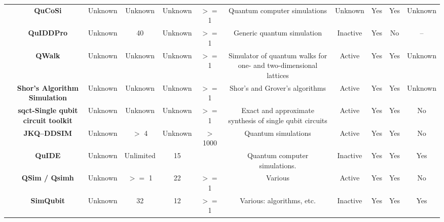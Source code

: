 \documentclass[conference]{IEEEtran}
\begin{document}
\begin{table*}[h!]
{\begin{tabular}{c|c|c|c|c|c|c|c|c|c|c}
	           & \textbf{QuCoSi } & Unknown & Unknown & Unknown & $>=$1 & Quantum computer simulations & Unknown & Yes   & Yes   & Unknown \\
	           & \textbf{QuIDDPro } & Unknown & 40    & Unknown & $>=$1 & Generic quantum simulation & Inactive & Yes   & No    & -- \\
	           & \textbf{QWalk } & Unknown & Unknown & Unknown & $>=$1 & Simulator of quantum walks for one- and two-dimensional lattices & Active & Yes   & Yes   & Unknown \\
	           & \textbf{Shor's Algorithm Simulation } & Unknown & Unknown & Unknown & $>=$1 & Shor's and Grover's algorithms & Active & Yes   & Yes   & Unknown \\
	           & \textbf{sqct-Single qubit circuit toolkit } & Unknown & Unknown & Unknown & $>=$1 & Exact and approximate synthesis of single qubit circuits & Active & Yes   & Yes   & No \\
	           & \textbf{JKQ--DDSIM } & Unknown & $>$ 4   & Unknown & $>$ 1000 & Quantum simulations & Active & Yes   & Yes   & No \\
     		   & \textbf{QuIDE } & Unknown & \cellcolor{gray!50} Unlimited & 15    &       & Quantum computer simulations. & Inactive & Yes   & Yes   & Yes \\ 
      	 	   & \textbf{QSim / Qsimh} & Unknown & $>=$ 1   & 22    & $>=$ 1  & Various & Active & Yes   & Yes   & No \\
               & \textbf{SimQubit } & Unknown & 32    & 12    & $>=$ 1  & Various: algorithms, etc. & Inactive & Yes   & Yes   & Yes \\ \hline
    

\end{tabular}}
\end{table*}
\end{document}
